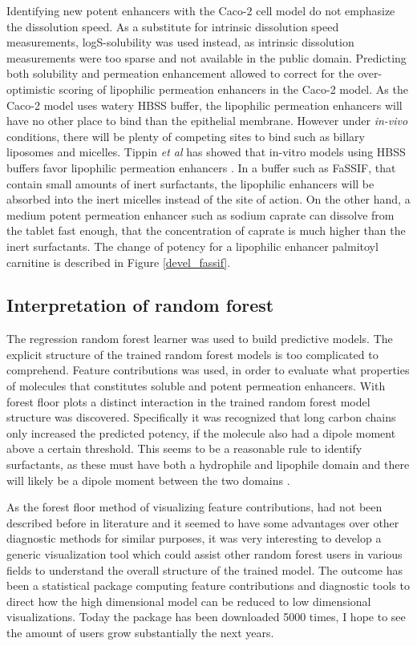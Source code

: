 Identifying new potent enhancers with the Caco-2 cell model do not emphasize the dissolution speed. As a substitute for intrinsic dissolution speed measurements, logS-solubility was used instead, as intrinsic dissolution measurements were too sparse and not available in the public domain. Predicting both solubility and permeation enhancement allowed to correct for the over-optimistic scoring of lipophilic permeation enhancers in the Caco-2 model. As the Caco-2 model uses watery HBSS buffer, the lipophilic permeation enhancers will have no other place to bind than the epithelial membrane. However under \textit{in-vivo} conditions, there will be plenty of competing sites to bind such as billary liposomes and micelles. Tippin \textit{et al} has showed that in-vitro models using HBSS buffers favor lipophilic permeation enhancers \cite{tippin2008biorelevant}. In a buffer such as FaSSIF, that contain small amounts of inert surfactants, the lipophilic enhancers will be absorbed into the inert micelles instead of the site of action. On the other hand, a medium potent permeation enhancer such as sodium caprate can dissolve from the tablet fast enough, that the concentration of caprate is much higher than the inert surfactants. The change of potency for a lipophilic enhancer palmitoyl carnitine is described in Figure \ref{devel_fassif}.


\subsection{Interpretation of random forest}
The regression random forest learner was used to build predictive models. The explicit structure of the trained random forest models is too complicated to comprehend. Feature contributions was used, in order to evaluate what properties of molecules that constitutes soluble and potent permeation enhancers. With forest floor plots a distinct interaction in the trained random forest model structure was discovered. Specifically it was recognized that long carbon chains only increased the predicted potency, if the molecule also had a dipole moment above a certain threshold. This seems to be a reasonable rule to identify surfactants, as these must have both a hydrophile and lipophile domain and there will likely be a dipole moment between the two domains \cite{rosen2012surfactants}.

As the forest floor method of visualizing feature contributions, had not been described before in literature and it seemed to have some advantages over other diagnostic methods for similar purposes, it was very interesting to develop a generic visualization tool which could assist other random forest users in various fields to understand the overall structure of the trained model. The outcome has been a statistical package computing feature contributions and diagnostic tools to direct how the high dimensional model can be reduced to low dimensional visualizations. Today the package has been downloaded 5000 times, I hope to see the amount of users grow substantially the next years.